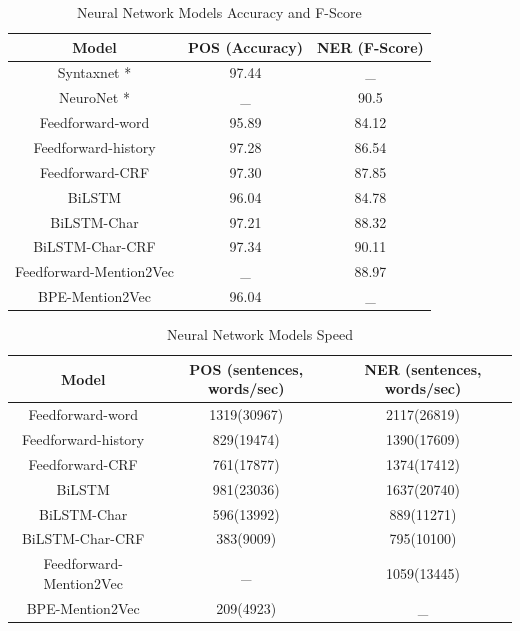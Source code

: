 \documentclass{sfuthesis}
\begin{document}
\begin{table}[]
\centering
\caption{Neural Network Models Accuracy and F-Score}
\label{table:my-label1}
\begin{tabular}{|c|c|c|}
\hline
Model         & POS (Accuracy)  & NER (F-Score)       \\ \hline
Syntaxnet \**    & 97.44         &   _     \\ \hline
NeuroNet \**    & _    & 90.5                \\ \hline 
Feedforward-word    & 95.89          &   84.12     \\ \hline
Feedforward-history & 97.28     & 86.54        \\ \hline
Feedforward-CRF     & 97.30          &   87.85     \\ \hline
BiLSTM  & 96.04     & 84.78                             \\ \hline
BiLSTM-Char & 97.21 & 88.32             \\ \hline
BiLSTM-Char-CRF & 97.34  & 90.11             \\ \hline
Feedforward-Mention2Vec  & _    & 88.97                       \\ \hline
BPE-Mention2Vec & 96.04     &  _   \\ \hline   
\end{tabular}
\end{table}

\begin{table}[]
\centering
\caption{Neural Network Models Speed}
\label{table:my-label2}
\begin{tabular}{|c|c|c|}
\hline
Model       & POS  (sentences, words/sec)  & NER  (sentences, words/sec)      \\ \hline
Feedforward-word    & 1319(30967)     & 2117(26819)    \\ \hline
Feedforward-history & 829(19474)     & 1390(17609)     \\ \hline
Feedforward-CRF     & 761(17877)     & 1374(17412)     \\ \hline
BiLSTM             &981(23036)     & 1637(20740)       \\ \hline
BiLSTM-Char        & 596(13992)  & 889(11271)           \\ \hline
BiLSTM-Char-CRF    & 383(9009)  & 795(10100)         \\ \hline
Feedforward-Mention2Vec         & _      & 1059(13445)              \\ \hline
BPE-Mention2Vec     & 209(4923)  &  _               \\ \hline   
\end{tabular}
\end{table}
\end{document}
